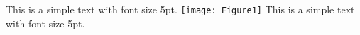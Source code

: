 \documentclass[a4paper]{article}
\begin{document}
    \noindent %
    \thispagestyle{empty} %
    \begin{center} %
        \vspace*{\fill} %
        {\fontsize{5pt}{6pt}\selectfont This is a simple text with font size 5pt.}
        \texttt{[image: Figure1]} %
        \captionsetup{} %
        {\fontsize{5pt}{5pt}\selectfont This is a simple text with font size 5pt.} %
        \vspace*{\fill} %
    \end{center}
\end{document}
